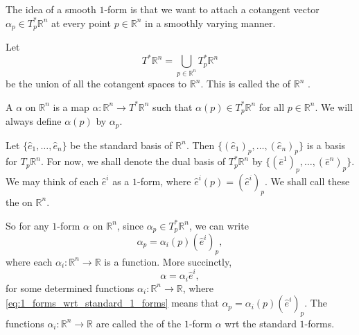 \documentclass[notoc,notitlepage]{tufte-book}
\begin{document}
\begin{remark}
  The idea of a smooth $1$-form is that we want to attach a cotangent vector $\alpha_p \in
  T_p^* \mathbb{R}^n$ at every point $p \in \mathbb{R}^n$ in a smoothly varying manner.
\end{remark}

Let
\begin{equation*}
  T^* \mathbb{R}^n = \bigcup_{p \in \mathbb{R}^n} T_p^* \mathbb{R}^n
\end{equation*}
be the union of all the cotangent spaces to $\mathbb{R}^n$. This is called the  of $\mathbb{R}^n$ .

\begin{defn}\label{defn:_1_form_on_the_cotangent_bundle}
  A  $\alpha$ on $\mathbb{R}^n$ is a map $\alpha : \mathbb{R}^n \to
  T^* \mathbb{R}^n$ such that $\alpha(p) \in T_p^* \mathbb{R}^n$ for all $p \in \mathbb{R}^n$.
  We will always define $\alpha(p)$ by $\alpha_p$.
\end{defn}

Let $\{ \hat{e}_1, \ldots, \hat{e}_n \}$ be the standard basis of $\mathbb{R}^n$. Then $\{
(\hat{e}_1)_p, \ldots, (\hat{e}_n)_p \}$ is a basis for $T_p \mathbb{R}^n$. For now, we shall
denote the dual basis of $T_p^* \mathbb{R}^n$ by $\{ (\hat{e}^1)_p, \ldots, (\hat{e}^n)_p \}$.
We may think of each $\hat{e}^i$ as a $1$-form, where $\hat{e}^i (p) = (\hat{e}^i)_p$. We shall
call these the  on $\mathbb{R}^n$.

So for any $1$-form $\alpha$ on $\mathbb{R}^n$, since $\alpha_p \in T_p^* \mathbb{R}^n$, we can
write
\begin{equation*}
  \alpha_p = \alpha_i (p) (\hat{e}^i)_p,
\end{equation*}
where each $\alpha_i : \mathbb{R}^n \to \mathbb{R}$ is a function. More succinctly,
\begin{equation}\label{eq:1_forms_wrt_standard_1_forms}
  \alpha = \alpha_i \hat{e}^i,
\end{equation}
for some  determined functions $\alpha_i : \mathbb{R}^n \to \mathbb{R}$, where
\cref{eq:1_forms_wrt_standard_1_forms} means that $\alpha_p = \alpha_i(p)(\hat{e}^i)_p$. The
functions $\alpha_i : \mathbb{R}^n \to \mathbb{R}$ are called the  of
the $1$-form $\alpha$ wrt the standard $1$-forms.
\end{document}
